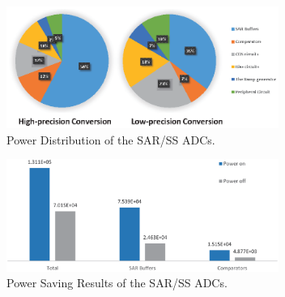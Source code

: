 \begin{figure}[htbp]
	\centerline{\includegraphics[width=3.5in]{./Figures/SARResults1.eps}}
	\caption{Power Distribution of the SAR/SS ADCs.}
	\label{SARresults1}
\end{figure} 

\begin{figure}[htbp]
	\centerline{\includegraphics[width=3.5in]{./Figures/SARResults2.eps}}
	\caption{Power Saving Results of the SAR/SS ADCs.}
	\label{SARresults2}
\end{figure} 